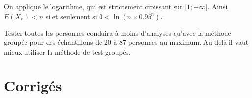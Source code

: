 \documentclass[11pt,fleqn, openany]{book} %
\begin{document}
\begin{solution}
\begin{enumerate}
On applique le logarithme, qui est strictement croissant sur $[1;+\infty[$. Ainsi, $E(X_n)<n$ si et seulement si $0< \ln(n \times 0.95^n)$.

Tester toutes les personnes conduira à moins d'analyses qu'avec la méthode groupée pour des échantillons de 20 à 87 personnes au maximum. Au delà il vaut mieux utiliser
la méthode de test groupés.\end{enumerate}
\end{solution}


\chapter{Corrigés}



\printsolutions[headings={false} ]
\end{document}
